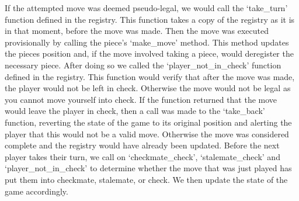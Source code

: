 \documentclass{article}
\begin{document}
If the attempted move was deemed pseudo-legal, we would call the `take\_turn' function defined in the registry. This function takes a copy of the registry as it is in that moment, before the move was made. Then the move was executed provisionally by calling the piece's `make\_move' method. This method updates the pieces position and, if the move involved taking a piece, would deregister the necessary piece. After doing so we called the `player\_not\_in\_check' function defined in the registry. This function would verify that after the move was made, the player would not be left in check. Otherwise the move would not be legal as you cannot move yourself into check. If the function returned that the move would leave the player in check, then a call was made to the `take\_back' function, reverting the state of the game to its original position and alerting the player that this would not be a valid move. Otherwise the move was considered complete and the registry would have already been updated. Before the next player takes their turn, we call on `checkmate\_check', `stalemate\_check' and `player\_not\_in\_check' to determine whether the move that was just played has put them into checkmate, stalemate, or check. We then update the state of the game accordingly. 
\end{document}
